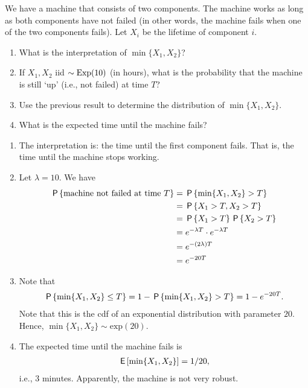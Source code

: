 \documentclass[assignments]{subfiles}
\begin{document}
\begin{exercise}
We have a machine that consists of two components.
The machine works as long as both components have not failed (in other words, the machine fails when one of the two components fails).
Let $X_i$ be the lifetime of component $i$.
\begin{enumerate}
\item What is the interpretation of $\min\{X_1, X_{2}\}$?
\item If $X_1, X_2$ iid $\sim \Exp{10}$ (in hours), what is the probability that the machine is still `up' (i.e., not failed) at time $T$?
\item Use the previous result to determine the distribution of $\min \{X_1, X_2\}$.
\item What is the expected time until the machine fails?
\end{enumerate}
\begin{solution}
\begin{enumerate}
    \item The interpretation is: the time until the first component fails. That is, the time until the machine stops working.
    \item Let $\lambda = 10$. We have
    \begin{align}
        \P{\text{machine not failed at time $T$}} &= \P{\min\{X_1, X_2\} > T} \\
        &= \P{X_1 > T, X_2 > T} \\
        &= \P{X_1 > T}\P{X_2 > T} \\
        &= e^{-\lambda T} \cdot e^{-\lambda T} \\
        &= e^{-(2\lambda)T} \\
        &= e^{-20T} \\
    \end{align}
    \item Note that
    \begin{align}
        \P{\min\{X_1, X_2\} \leq T} = 1 - \P{\min\{X_1, X_2\} > T} = 1 - e^{-20T}.
    \end{align}
    Note that this is the cdf of an exponential distribution with parameter $20$. Hence, $\min\{X_1, X_2\} \sim \text{exp}(20)$.
    \item The expected time until the machine fails is
    \begin{align}
        \E{\min\{X_1, X_2\}} = 1/20,
    \end{align}
    i.e., 3 minutes. Apparently, the machine is not very robust.
\end{enumerate}
\end{solution}
\end{exercise}
\end{document}
